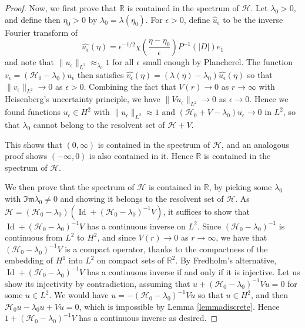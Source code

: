 \documentclass[11 pt]{amsart}
\theoremstyle{definition}
\theoremstyle{remark}
\numberwithin{equation}{section}
\begin{document}
\begin{proof}
Now, we first prove that $\mathbb R$ is contained in the spectrum of $\mathcal H$. Let $\lambda_0>0$, and define then $\eta_0>0$ by $\lambda_0=\lambda(\eta_0)$. For $\epsilon>0$, define $\hat u_\epsilon$ to be the inverse Fourier transform of
$$
\widehat{u_\epsilon}(\eta)=\epsilon^{-1/2}\chi\left(\frac{\eta-\eta_0}{\epsilon}\right)P^{-1}(|D|)e_1
$$
and note that $\|u_\epsilon\|_{L^2}\approx_{\lambda_0} 1$ for all $\epsilon$ small enough by Plancherel. The function $v_\epsilon=(\mathcal H_0-\lambda_0)u_\epsilon$ then satisfies $\widehat{v_\epsilon}(\eta)=(\lambda(\eta)-\lambda_0)\widehat{u_\epsilon}(\eta)$ so that $\| v_\epsilon\|_{L^2}\to 0$ as $\epsilon>0$. Combining the fact that $V(r)\to 0$ as $r\to \infty$ with Heisenberg's uncertainty principle, we have $\|Vu_\epsilon \|_{L^2}\to 0$ as $\epsilon\to 0$. Hence we found functions $u_\epsilon\in H^2$ with $\| u_\epsilon\|_{L^2}\approx 1$ and $(\mathcal H_0+V-\lambda_0)u_\epsilon\to 0$ in $L^2$, so that $\lambda_0$ cannot belong to the resolvent set of $\mathcal H+V$.

This shows that $(0,\infty)$ is contained in the spectrum of $\mathcal H$, and an analogous proof shows $(-\infty,0)$ is also contained in it. Hence $\mathbb R$ is contained in the spectrum of $\mathcal H$.

We then prove that the spectrum of $\mathcal H$ is contained in $\mathbb R$, by picking some $\lambda_0$ with $\mathfrak{Im} \lambda_0\neq 0$ and showing it belongs to the resolvent set of $\mathcal H$. As $\mathcal H=(\mathcal H_0-\lambda_0)(\operatorname{Id} +(\mathcal H_0-\lambda_0)^{-1}V)$, it suffices to show that $\operatorname{Id}+(\mathcal H_0-\lambda_0)^{-1}V$ has a continuous inverse on $L^2$. Since $(\mathcal H_0-\lambda_0)^{-1}$ is continuous from $L^2$ to $H^2$, and since $V(r)\to 0$ as $r\to \infty$, we have that $(\mathcal H_0-\lambda_0)^{-1}V$ is a compact operator, thanks to the compactness of the embedding of $H^1$ into $L^2$ on compact sets of $\mathbb R^2$. By Fredholm's alternative, $\operatorname{Id}+(\mathcal H_0-\lambda_0)^{-1}V$ has a continuous inverse if and only if it is injective. Let us show its injectivity by contradiction, assuming that $u+(\mathcal H_0-\lambda_0)^{-1}Vu=0$ for some $u\in L^2$. We would have $u=-(\mathcal H_0-\lambda_0)^{-1}Vu$ so that $u\in H^2$, and then $\mathcal H_0u-\lambda_0 u+Vu=0$, which is impossible by Lemma \ref{lemmadiscrete}. Hence $1+(\mathcal H_0-\lambda_0)^{-1}V$ has a continuous inverse as desired.
\end{proof}
\end{document}
